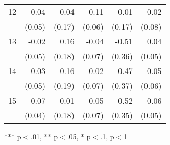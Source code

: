 \begin{tabular}{llllll}
\multicolumn{1}{l}{12} &
  \multicolumn{1}{|r}{0.04} &
  \multicolumn{1}{r}{-0.04} &
  \multicolumn{1}{r}{-0.11} &
  \multicolumn{1}{r}{-0.01} &
  \multicolumn{1}{r}{-0.02} \\
\multicolumn{1}{l}{} &
  \multicolumn{1}{|r}{(0.05)} &
  \multicolumn{1}{r}{(0.17)} &
  \multicolumn{1}{r}{(0.06)} &
  \multicolumn{1}{r}{(0.17)} &
  \multicolumn{1}{r}{(0.08)} \\
\multicolumn{1}{l}{13} &
  \multicolumn{1}{|r}{-0.02} &
  \multicolumn{1}{r}{0.16} &
  \multicolumn{1}{r}{-0.04} &
  \multicolumn{1}{r}{-0.51} &
  \multicolumn{1}{r}{0.04} \\
\multicolumn{1}{l}{} &
  \multicolumn{1}{|r}{(0.05)} &
  \multicolumn{1}{r}{(0.18)} &
  \multicolumn{1}{r}{(0.07)} &
  \multicolumn{1}{r}{(0.36)} &
  \multicolumn{1}{r}{(0.05)} \\
\multicolumn{1}{l}{14} &
  \multicolumn{1}{|r}{-0.03} &
  \multicolumn{1}{r}{0.16} &
  \multicolumn{1}{r}{-0.02} &
  \multicolumn{1}{r}{-0.47} &
  \multicolumn{1}{r}{0.05} \\
\multicolumn{1}{l}{} &
  \multicolumn{1}{|r}{(0.05)} &
  \multicolumn{1}{r}{(0.19)} &
  \multicolumn{1}{r}{(0.07)} &
  \multicolumn{1}{r}{(0.37)} &
  \multicolumn{1}{r}{(0.06)} \\
\multicolumn{1}{l}{15} &
  \multicolumn{1}{|r}{-0.07} &
  \multicolumn{1}{r}{-0.01} &
  \multicolumn{1}{r}{0.05} &
  \multicolumn{1}{r}{-0.52} &
  \multicolumn{1}{r}{-0.06} \\
\multicolumn{1}{l}{} &
  \multicolumn{1}{|r}{(0.04)} &
  \multicolumn{1}{r}{(0.18)} &
  \multicolumn{1}{r}{(0.07)} &
  \multicolumn{1}{r}{(0.35)} &
  \multicolumn{1}{r}{(0.05)} \\
\cline{1-6}
\end{tabular}

\footnotesize{
*** p$<$.01, ** p$<$.05, * p$<$.1,  p$<$1
}
